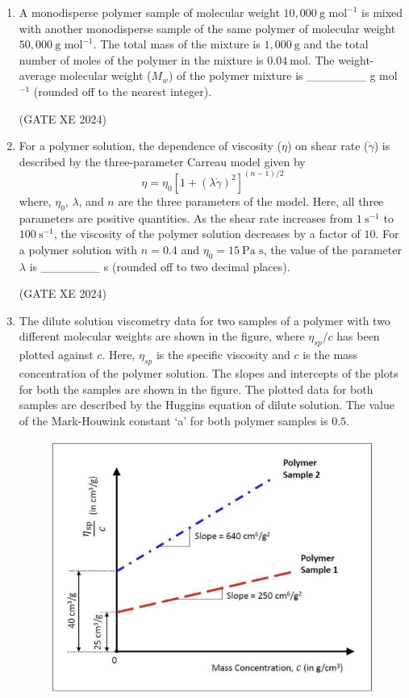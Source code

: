 \documentclass[12pt]{article}
\begin{document}
\begin{enumerate}
(GATE XE 2024)

\item A monodisperse polymer sample of molecular weight $10{,}000\ \text{g mol}^{-1}$ is mixed with another monodisperse sample of the same polymer of molecular weight $50{,}000\ \text{g mol}^{-1}$. The total mass of the mixture is $1{,}000\ \text{g}$ and the total number of moles of the polymer in the mixture is $0.04\ \text{mol}$. The weight-average molecular weight ($M_w$) of the polymer mixture is \_\_\_\_\_\_\_ g mol$^{-1}$ (rounded off to the nearest integer).  

(GATE XE 2024)

\item For a polymer solution, the dependence of viscosity ($\eta$) on shear rate ($\dot{\gamma}$) is described by the three-parameter Carreau model given by  
$$
\eta=\eta_0\left[1+(\lambda \dot{\gamma})^{2}\right]^{(n-1)/2}
$$
where, $\eta_0$, $\lambda$, and $n$ are the three parameters of the model. Here, all three parameters are positive quantities. As the shear rate increases from $1\ \text{s}^{-1}$ to $100\ \text{s}^{-1}$, the viscosity of the polymer solution decreases by a factor of $10$. For a polymer solution with $n=0.4$ and $\eta_0=15\ \text{Pa s}$, the value of the parameter $\lambda$ is \_\_\_\_\_\_\_ s (rounded off to two decimal places).  

(GATE XE 2024)

\item The dilute solution viscometry data for two samples of a polymer with two different molecular weights are shown in the figure, where $\eta_{sp}/c$ has been plotted against $c$. Here, $\eta_{sp}$ is the specific viscosity and $c$ is the mass concentration of the polymer solution. The slopes and intercepts of the plots for both the samples are shown in the figure. The plotted data for both samples are described by the Huggins equation of dilute solution. The value of the Mark-Houwink constant `a' for both polymer samples is $0.5$.

\begin{figure}[H]
    \centering
    \includegraphics[width=0.5\columnwidth]{figs/ass5_f_q130.png}
    \caption{}
    \label{fig:placeholder}
\end{figure}


\end{enumerate}
\end{document}
